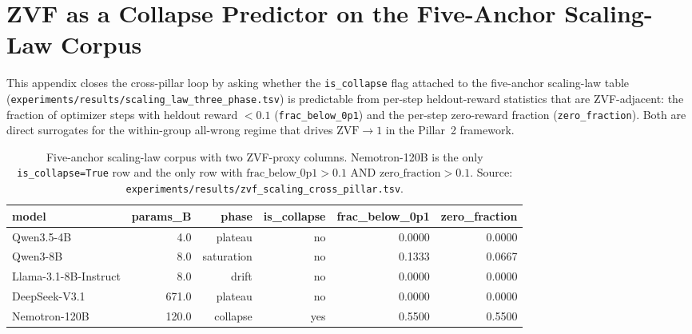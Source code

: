 %


\section{ZVF as a Collapse Predictor on the Five-Anchor Scaling-Law Corpus}
\label{sec:zvf-scaling}

This appendix closes the cross-pillar loop by asking whether the
\texttt{is\_collapse} flag attached to the five-anchor scaling-law
table (\texttt{experiments/results/scaling\_law\_three\_phase.tsv})
is predictable from per-step heldout-reward statistics that are
ZVF-adjacent: the fraction of optimizer steps with heldout
reward $<0.1$ (\texttt{frac\_below\_0p1}) and the per-step
zero-reward fraction (\texttt{zero\_fraction}). Both are direct
surrogates for the within-group all-wrong regime that drives
$\mathrm{ZVF} \to 1$ in the Pillar~2 framework.

\begin{table}[htbp]
\centering
\small
\begin{tabular}{lrrrrr}
\toprule
model & params\_B & phase & is\_collapse & frac\_below\_0p1 & zero\_fraction \\
\midrule
Qwen3.5-4B & 4.0 & plateau & no & 0.0000 & 0.0000 \\
Qwen3-8B & 8.0 & saturation & no & 0.1333 & 0.0667 \\
Llama-3.1-8B-Instruct & 8.0 & drift & no & 0.0000 & 0.0000 \\
DeepSeek-V3.1 & 671.0 & plateau & no & 0.0000 & 0.0000 \\
Nemotron-120B & 120.0 & collapse & yes & 0.5500 & 0.5500 \\
\bottomrule
\end{tabular}
\caption{Five-anchor scaling-law corpus with two ZVF-proxy columns. Nemotron-120B is the only \texttt{is\_collapse=True} row and the only row with $\text{frac\_below\_0p1} > 0.1$ AND $\text{zero\_fraction} > 0.1$. Source: \texttt{experiments/results/zvf\_scaling\_cross\_pillar.tsv}.}
\label{tab:zvf-scaling-anchors}
\end{table}

